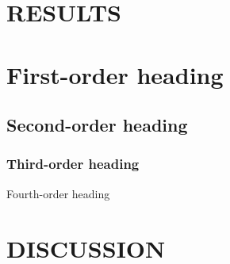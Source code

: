 \documentclass[12pt]{article}
\begin{document}



\section*{\sffamily \Large RESULTS}


\section*{\sffamily \Large First-order heading}
 


\subsection*{\sffamily \large Second-order heading}

\subsubsection*{\sffamily \normalsize Third-order heading}

{\sffamily \small Fourth-order heading}\\

\section*{\sffamily \Large DISCUSSION}

\end{document}
